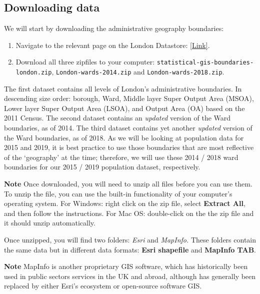 \documentclass[
]{book}
\providecommand{\tightlist}{%
  \setlength{\itemsep}{0pt}\setlength{\parskip}{0pt}}
\begin{document}
\hypertarget{w02-downloading}{%
\subsection{Downloading data}\label{w02-downloading}}

We will start by downloading the administrative geography boundaries:

\begin{enumerate}
\def\labelenumi{\arabic{enumi}.}
\tightlist
\item
  Navigate to the relevant page on the London Datastore: \href{https://data.london.gov.uk/dataset/statistical-gis-boundary-files-london}{{[}Link{]}}.
\item
  Download all three zipfiles to your computer: \texttt{statistical-gis-boundaries-london.zip}, \texttt{London-wards-2014.zip} and \texttt{London-wards-2018.zip}.
\end{enumerate}

The first dataset contains all levels of London's administrative boundaries. In descending size order: borough, Ward, Middle layer Super Output Area (MSOA), Lower layer Super Output Area (LSOA), and Output Area (OA) based on the 2011 Census. The second dataset contains an \emph{updated} version of the Ward boundaries, as of 2014. The third dataset contains yet another \emph{updated} version of the Ward boundaries, as of 2018. As we will be looking at population data for 2015 and 2019, it is best practice to use those boundaries that are most reflective of the `geography' at the time; therefore, we will use these 2014 / 2018 ward boundaries for our 2015 / 2019 population dataset, respectively.

\textbf{Note}
Once downloaded, you will need to unzip all files before you can use them. To unzip the file, you can use the built-in functionality of your computer's operating system. For Windows: right click on the zip file, select \textbf{Extract All}, and then follow the instructions. For Mac OS: double-click on the the zip file and it should unzip automatically.

Once unzipped, you will find two folders: \emph{Esri} and \emph{MapInfo.} These folders contain the same data but in different data formats: \textbf{Esri shapefile} and \textbf{MapInfo TAB}.

\textbf{Note}
MapInfo is another proprietary GIS software, which has historically been used in public sectors services in the UK and abroad, although has generally been replaced by either Esri's ecosystem or open-source software GIS.
\end{document}
